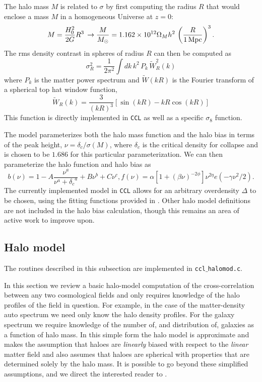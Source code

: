 \documentclass[\docopts]{\docclass}
\newcommand{\ccl}{{\tt CCL}\xspace}
\begin{document}
The halo mass $M$ is related to $\sigma$ by first computing the radius $R$ that would enclose a mass $M$ in a homogeneous Universe at $z=0$:
\begin{equation}
  M=\frac{H_0^2}{2G}R^3\,\rightarrow \frac{M}{M_\odot}=1.162\times10^{12}\Omega_Mh^2\,\left(\frac{R}{1\,{\rm Mpc}}\right)^3.
\end{equation}
The rms density contrast in spheres of radius $R$ can then be computed as
\begin{equation}
  \sigma_R^2 = \frac{1}{2\pi^2}\int dk\,k^2\,P_k\,\tilde{W}_R^2(k)
  \label{eq:sigR}
\end{equation}
where $P_k$ is the matter power spectrum and $\tilde{W}(kR)$ is the Fourier transform of a spherical top hat window function,
\begin{equation}
\tilde{W}_R(k) = \frac{3}{(kR)^3}[\sin(kR)-kR\cos(kR)]
\end{equation}
%
This function is directly implemented in \ccl as well as a specific $\sigma_8$ function.

The \citet{Tinker2010} model parameterizes both the halo mass function and the halo bias in terms of the peak height, $\nu = \delta_c / \sigma(M)$, where $\delta_c$ is the critical density for collapse and is chosen to be $1.686$ for this particular parameterization. We can then parameterize the halo function and halo bias as
\begin{equation}
  b(\nu) = 1 - A\frac{\nu^a}{\nu^a + {\delta_c}^a} + B\nu^b+C\nu^c,
  f(\nu) = \alpha[1+(\beta\nu)^{-2\phi}]\nu^{2\eta}e(-\gamma\nu^2/2).
  \label{eq:halo_bias_and_mass_function}
\end{equation}
The currently implemented model in \ccl allows for an arbitrary overdensity $\Delta$ to be chosen, using the fitting functions provided in \citet{Tinker2010}. Other halo model definitions are not included in the halo bias calculation, though this remains an area of active work to improve upon.


\subsection{Halo model}
\label{sec:halo_model}

The routines described in this subsection are implemented in {\tt ccl$\_$halomod.c}.

In this section we review a basic halo-model computation \citep{Seljak2000,Peacock2000,Cooray2002} of the cross-correlation between any two cosmological fields and only requires knowledge of the halo profiles of the field in question. For example, in the case of the matter-density auto spectrum we need only know the halo density profiles. For the galaxy spectrum we require knowledge of the number of, and distribution of, galaxies as a function of halo mass. In this simple form the halo model is approximate and makes the assumption that haloes are \emph{linearly} biased with respect to the \emph{linear} matter field and also assumes that haloes are spherical with properties that are determined solely by the halo mass. It is possible to go beyond these simplified assumptions, and we direct the interested reader to \cite{Cooray2002,Smith2007,Giocoli2010,Smith2011}.
\end{document}
